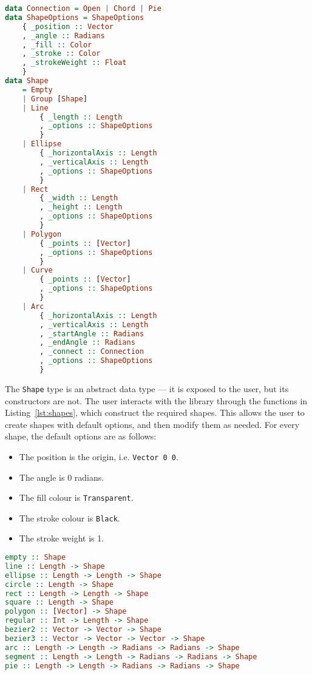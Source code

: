 \documentclass[../main.tex]{subfiles}
\begin{document}
                \begin{lstlisting}[language={Haskell}, label={lst:shape}, caption={The \texttt{Shape} 
                    type definition.}]
data Connection = Open | Chord | Pie
data ShapeOptions = ShapeOptions
    { _position :: Vector
    , _angle :: Radians
    , _fill :: Color
    , _stroke :: Color
    , _strokeWeight :: Float
    }
data Shape
    = Empty
    | Group [Shape]
    | Line
        { _length :: Length
        , _options :: ShapeOptions
        }
    | Ellipse
        { _horizontalAxis :: Length
        , _verticalAxis :: Length
        , _options :: ShapeOptions
        }
    | Rect
        { _width :: Length
        , _height :: Length
        , _options :: ShapeOptions
        }
    | Polygon
        { _points :: [Vector]
        , _options :: ShapeOptions
        }
    | Curve
        { _points :: [Vector]
        , _options :: ShapeOptions
        }
    | Arc
        { _horizontalAxis :: Length
        , _verticalAxis :: Length
        , _startAngle :: Radians
        , _endAngle :: Radians
        , _connect :: Connection
        , _options :: ShapeOptions
        }\end{lstlisting}

                The \texttt{Shape} type is an abstract data type — it is exposed to the user,
                    but its constructors are not.
                The user interacts with the library through the functions in
                    Listing~\ref{lst:shapes}, which construct the required shapes.
                This allows the user to create shapes with default options, and then modify
                    them as needed.
                For every shape, the default options are as follows:
                \begin{itemize}
                    \item The position is the origin, i.e. \texttt{Vector 0 0}.
                    \item The angle is 0 radians.
                    \item The fill colour is \texttt{Transparent}.
                    \item The stroke colour is \texttt{Black}.
                    \item The stroke weight is 1.
                \end{itemize}

                \begin{lstlisting}[language={Haskell}, label={lst:shapes}, caption={The functions to 
                    create shapes.}]
empty :: Shape
line :: Length -> Shape
ellipse :: Length -> Length -> Shape
circle :: Length -> Shape
rect :: Length -> Length -> Shape
square :: Length -> Shape
polygon :: [Vector] -> Shape
regular :: Int -> Length -> Shape
bezier2 :: Vector -> Vector -> Shape
bezier3 :: Vector -> Vector -> Vector -> Shape
arc :: Length -> Length -> Radians -> Radians -> Shape
segment :: Length -> Length -> Radians -> Radians -> Shape
pie :: Length -> Length -> Radians -> Radians -> Shape\end{lstlisting}
\end{document}
